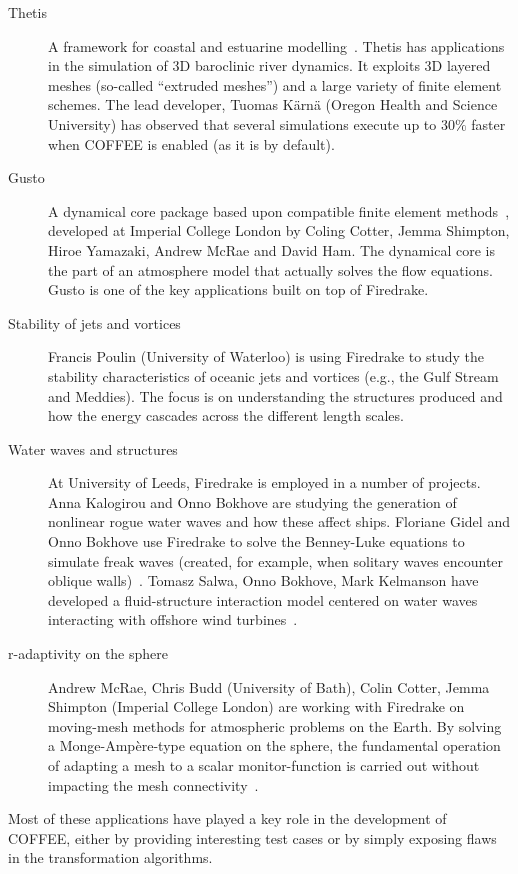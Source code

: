 \begin{description}
\item[Thetis] A framework for coastal and estuarine modelling~\citep{thetis-webpage}. Thetis has applications in the simulation of 3D baroclinic river dynamics. It exploits 3D layered meshes (so-called ``extruded meshes'') and a large variety of finite element schemes. The lead developer, Tuomas K{\"a}rn{\"a} (Oregon Health and Science University) has observed that several simulations execute up to 30$\%$ faster when COFFEE is enabled (as it is by default).
\item[Gusto] A dynamical core package based upon compatible finite element methods~\citep{gusto-webpage}, developed at Imperial College London by Coling Cotter, Jemma Shimpton, Hiroe Yamazaki, Andrew McRae and David Ham. The dynamical core is the part of an atmosphere model that actually solves the flow equations. Gusto is one of the key applications built on top of Firedrake.
\item[Stability of jets and vortices] Francis Poulin (University of Waterloo) is using Firedrake to study the stability characteristics of oceanic jets and vortices (e.g., the Gulf Stream and Meddies). The focus is on understanding the structures produced and how the energy cascades across the different length scales.
\item[Water waves and structures] At University of Leeds, Firedrake is employed in a number of projects. Anna Kalogirou and Onno Bokhove are studying the generation of nonlinear rogue water waves and how these affect ships. Floriane Gidel and Onno Bokhove use Firedrake to solve the Benney-Luke equations to simulate freak waves (created, for example, when solitary waves encounter oblique walls)~\citep{gidel-bokhove}. Tomasz Salwa, Onno Bokhove, Mark Kelmanson have developed a fluid-structure interaction model centered on water waves interacting with offshore wind turbines~\citep{salwa-bokhove-kelmanson}.
\item[r-adaptivity on the sphere] Andrew McRae, Chris Budd (University of Bath), Colin Cotter, Jemma Shimpton (Imperial College London) are working with Firedrake on moving-mesh methods for atmospheric problems on the Earth. By solving a Monge-Ampère-type equation on the sphere, the fundamental operation of adapting a mesh to a scalar monitor-function is carried out without impacting the mesh connectivity~\citep{r-adaptivity}.
\end{description}

Most of these applications have played a key role in the development of COFFEE, either by providing interesting test cases or by simply exposing flaws in the transformation algorithms.